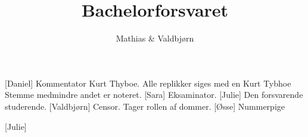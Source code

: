 \documentclass[a4paper,11pt]{article}
\title{Bachelorforsvaret}
\author{Mathias \& Valdbjørn }
\begin{document}
\maketitle

\begin{roles}
[Daniel] Kommentator Kurt Thyboe. Alle replikker siges med en Kurt Tybhoe Stemme medmindre andet er noteret.
[Sara] Eksaminator.
[Julie] Den forsvarende studerende.
[Valdbjørn] Censor. Tager rollen af dommer.
[Øsse] Nummerpige
\end{roles}

\begin{props}
[Julie]
\end{props}
\end{document}

